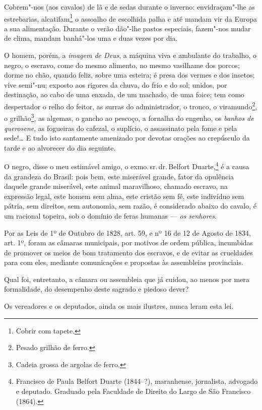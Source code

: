 Cobrem"-nos (aos cavalos) de lã e de sedas durante o inverno:
envidraçam"-lhe as estrebarias, alcatifam\footnote{Cobrir com tapete.}
o assoalho de escolhida palha e até mandam vir da Europa a sua
alimentação. Durante o verão dão"-lhe pastos especiais, fazem"-nos mudar
de clima, mandam banhá"-los uma e duas vezes por dia.

O homem, porém, a \emph{imagem de Deus}, a máquina viva e ambulante do
trabalho, o negro, o escravo, come do mesmo alimento, no mesmo vasilhame
dos porcos; dorme no chão, quando feliz, sobre uma esteira; é presa dos
vermes e dos insetos; vive semi"-nu; exposto aos rigores da chuva, do
frio e do sol; unidos, por destinação, ao cabo de uma enxada, de um
machado, de uma foice; tem como despertador o relho do feitor, as surras
do administrador, o tronco, o viramundo\footnote{Pesado grilhão de
  ferro.}, o grilhão\footnote{Cadeia grossa de argolas de ferro.}, as
algemas, o gancho ao pescoço, a fornalha do engenho, os \emph{banhos de
querosene}, as fogueiras do cafezal, o suplício, o assassinato pela fome
e pela sede!\ldots{} E tudo isto santamente amenizado por devotas orações ao
crepúsculo da tarde e ao alvorecer do dia seguinte.

O negro, disse o meu estimável amigo, o exmo.\,sr.\,dr.\,Belfort
Duarte,\footnote{Francisco de Paula Belfort Duarte (1844--?),
  maranhense, jornalista, advogado e deputado. Graduado pela Faculdade
  de Direito do Largo de São Francisco (1864).} é a causa da grandeza do
Brasil: pois bem, este miserável grande, fator da opulência daquele
grande miserável, este animal maravilhoso, chamado escravo, na expressão
legal, este homem sem alma, este cristão sem fé, este indivíduo sem
pátria, sem direitos, sem autonomia, sem razão, é considerado abaixo do
cavalo, é um racional topeira, sob o domínio de feras humanas ---
\emph{os senhores}.

Por as Leis de 1º de Outubro de 1828, art. 59, e nº 16 de 12 de Agosto
de 1834, art. 1º, foram as câmaras municipais, por motivos de ordem
pública, incumbidas de promover os meios de bom tratamento dos escravos,
e de evitar as crueldades para com eles, mediante comunicações e
propostas às assembleias provinciais.

Qual foi, entretanto, a câmara ou assembleia que já cuidou, ao menos por
mera formalidade, do desempenho deste sagrado e piedoso dever?

Os vereadores e os deputados, ainda os mais ilustres, nunca leram esta
lei.


